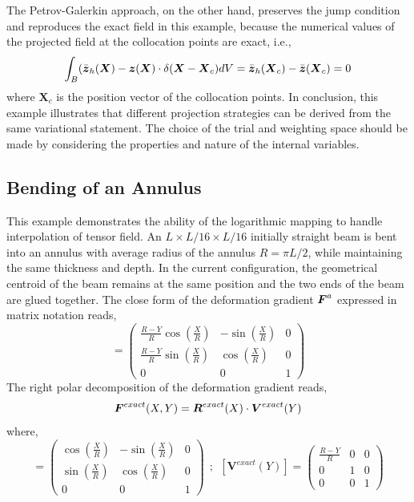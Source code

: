\documentclass[12pt]{article}
\newcommand{\mbs}[1]{\boldsymbol{#1}}
\def\bU{{\mbs{V}}} \def\bW{{\mbs{W}}} \def\bX{{\mbs{X}}}
\begin{document}
The Petrov-Galerkin approach, on the other hand, preserves the jump
condition and reproduces the exact field in this example, because the
numerical values of the projected field at the collocation points are
exact, i.e.,
\begin{equation}
  \int_{B} (\bar{\bz}_{h}(\bX) - \bz(\bX) \cdot \delta(\bX - \bX_{c})dV
  =
  \bar{\bz}_{h}(\bX_{c}) - \bar{\bz}(\bX_{c}) = 0
  \label{eq:PGOpmital}
\end{equation}
where $\bX_{c}$ is the position vector of the collocation points. In
conclusion, this example illustrates that different projection
strategies can be derived from the same variational statement. The
choice of the trial and weighting space should be made by considering
the properties and nature of the internal variables.

\subsection{Bending of an Annulus}
This example demonstrates the ability of the logarithmic mapping 
to handle interpolation of tensor field. An $L \times L/16 \times L/16$ 
initially straight beam is bent into an annulus with average radius of the 
annulus $R = \pi L /2$, while maintaining the same thickness and depth. 
In the current configuration, the geometrical centroid of the beam remains 
at the same position and the two ends of the beam are glued together. The 
close form of the deformation gradient $\bF^{a}$ expressed in matrix notation
 reads, 
\begin{equation}
[\bF^{exact}(X, Y)] =  \left( \begin{array}{ccc}
\frac{R-Y}{R} \cos(\frac{X}{R}) & -\sin(\frac{X}{R}) & 0 \\
\frac{R-Y}{R} \sin(\frac{X}{R}) & \cos(\frac{X}{R})  & 0\\
0 & 0 & 1 \end{array} \right)
\label{eq:DeformGrad} 
\end{equation}
The right polar decomposition of the deformation gradient reads,
\begin{equation}
\bF^{exact}(X,Y) = \bR^{exact}(X) \cdot \bU^{exact}(Y) 
\label{eq:RightPolar}
\end{equation}
where,
\begin{equation}
[\bR^{exact}(X)] =  \left( \begin{array}{ccc}
 \cos(\frac{X}{R}) & -\sin(\frac{X}{R}) & 0 \\
\sin(\frac{X}{R}) & \cos(\frac{X}{R})  & 0\\
0 & 0 & 1 \end{array} \right) \: \: ; \: \:
[\bU^{exact}(Y)] =  \left( \begin{array}{ccc}
\frac{R-Y}{R}  & 0 & 0 \\
0 & 1 & 0\\
0 & 0 & 1 \end{array} \right)
\label{eq:PolarDecomposition} 
\end{equation}
\end{document}
